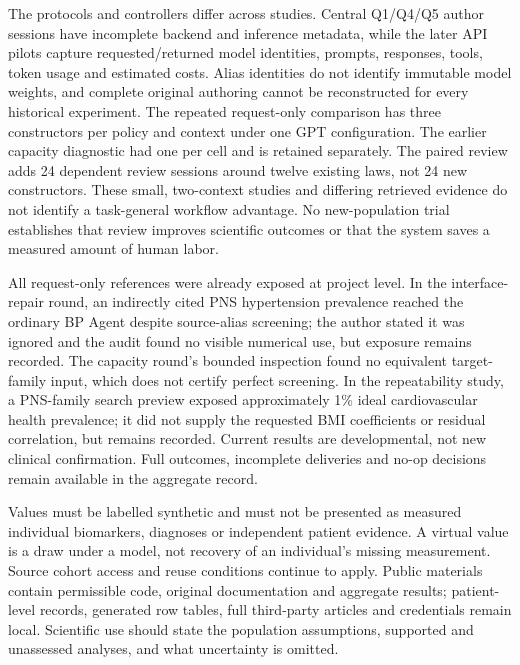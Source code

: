 \documentclass[11pt,letterpaper]{article}
\begin{document}
The protocols and controllers differ across studies. Central Q1/\allowbreak{}Q4/\allowbreak{}Q5 author sessions have incomplete backend and inference metadata, while the later API pilots capture requested/\allowbreak{}returned model identities, prompts, responses, tools, token usage and estimated costs. Alias identities do not identify immutable model weights, and complete original authoring cannot be reconstructed for every historical experiment. The repeated request-only comparison has three constructors per policy and context under one GPT configuration. The earlier capacity diagnostic had one per cell and is retained separately. The paired review adds 24 dependent review sessions around twelve existing laws, not 24 new constructors. These small, two-context studies and differing retrieved evidence do not identify a task-general workflow advantage. No new-population trial establishes that review improves scientific outcomes or that the system saves a measured amount of human labor.


All request-only references were already exposed at project level. In the interface-repair round, an indirectly cited PNS hypertension prevalence reached the ordinary BP Agent despite source-alias screening; the author stated it was ignored and the audit found no visible numerical use, but exposure remains recorded. The capacity round's bounded inspection found no equivalent target-family input, which does not certify perfect screening. In the repeatability study, a PNS-family search preview exposed approximately 1\% ideal cardiovascular health prevalence; it did not supply the requested BMI coefficients or residual correlation, but remains recorded. Current results are developmental, not new clinical confirmation. Full outcomes, incomplete deliveries and no-op decisions remain available in the aggregate record.


Values must be labelled synthetic and must not be presented as measured individual biomarkers, diagnoses or independent patient evidence. A virtual value is a draw under a model, not recovery of an individual's missing measurement. Source cohort access and reuse conditions continue to apply. Public materials contain permissible code, original documentation and aggregate results; patient-level records, generated row tables, full third-party articles and credentials remain local. Scientific use should state the population assumptions, supported and unassessed analyses, and what uncertainty is omitted.


\end{document}
